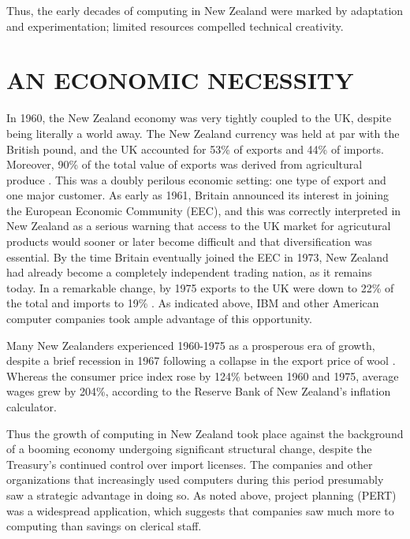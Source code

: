 \documentclass{IEEEcsmag}
\begin{document}
Thus, the early decades of computing in New Zealand were marked by adaptation and experimentation; limited resources compelled technical creativity.
\vspace*{-8pt}
\section{AN ECONOMIC NECESSITY}
\cbend
In 1960, the New Zealand economy was very tightly coupled to the UK, despite being literally a world away.
The New Zealand currency was held at par with the British pound, and the UK accounted for 53\% of exports and 44\% of imports.
Moreover, 90\% of the total value of exports was derived from agricultural produce \cite{Yearbook62}. 
This was a doubly perilous economic setting: one type of export and one major customer.
As early as 1961, Britain announced its interest in joining the European Economic Community (EEC),
and this was correctly interpreted in New Zealand as a serious warning that access to the UK market 
for agricutural products would sooner or later become difficult and that diversification was essential. By the time
Britain eventually joined the EEC in 1973, New Zealand had already become a completely independent
trading nation, as it remains today. In a remarkable change, by 1975 exports to the UK were down to 22\%
of the total and imports to 19\% \cite{Yearbook77}. 
As indicated above, IBM and other American computer companies took ample advantage of this opportunity.

\cbstart
Many New Zealanders experienced 1960-1975 as a prosperous era of growth,
despite a brief recession in 1967 \cite{Hall-2014} following a collapse in the export price of wool \cite{Easton-2020}.
Whereas the consumer price index rose by 124\% between 1960 and 1975, average wages grew by
204\%, according to the Reserve Bank of New Zealand’s inflation calculator.

Thus the growth of computing in New Zealand took place against the background of a
booming economy undergoing significant structural change, despite the Treasury’s continued
control over import licenses.
\cbend
The companies and other organizations that increasingly used computers during this period
presumably saw a strategic advantage in doing so. As noted above, project planning (PERT)
was a widespread application, which suggests that companies saw much more to computing than
savings on clerical staff. 
\end{document}
